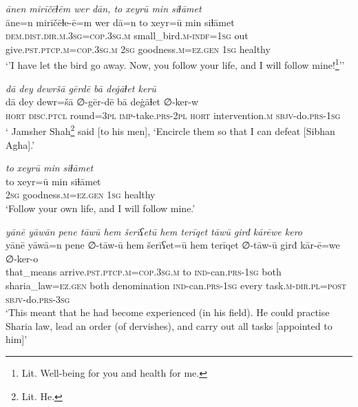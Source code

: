 \ea \label{DP.50}
\textit{ānen mirīčēɫēm wer dān, to xeyrū min siɫāmet} \\ 
\gll āne=n mirīčēɫe-ē=m wer dā=n to xeyr=ū min siɫāmet \\ 
 \textsc{dem.dist}\textsc{.dir}\textsc{.m}\textsc{.3sg}\textsc{=cop}\textsc{.3sg}\textsc{.m} small\_bird\textsc{.m}\textsc{-indf}\textsc{=1sg} out give\textsc{.pst}\textsc{.ptcp}\textsc{.m}\textsc{=cop}\textsc{.3sg}\textsc{.m} \textsc{2sg} goodness\textsc{.m}\textsc{=ez}\textsc{.gen} \textsc{1sg} healthy \\ 
\glt `’I have let the bird go away. Now, you follow your life, and I will follow mine!\footnote{Lit. Well-being for you and health for me.}’'
\z 
 
\ea \label{DP.51}
\textit{dā dey dewršā gērdē bā deġāɫet kerū} \\ 
\gll dā dey dewr=šā ∅-gēr-dē bā deġāɫet ∅-ker-w \\ 
 \textsc{hort} \textsc{disc.ptcl} round\textsc{=3pl} \textsc{imp-}take\textsc{.prs}\textsc{-2pl} \textsc{hort} intervention\textsc{.m} \textsc{sbjv-}do\textsc{.prs}\textsc{-1sg} \\ 
\glt ` Jamsher Shah\footnote{Lit. He.} said [to his men], ‘Encircle them so that I can defeat [Sibhan Agha].'
\z 
 
\ea \label{DP.55}
\textit{to xeyrū min siɫāmet} \\ 
\gll to xeyr=ū min siɫāmet \\ 
 \textsc{2sg} goodness\textsc{.m}\textsc{=ez}\textsc{.gen} \textsc{1sg} healthy \\ 
\glt `Follow your own life, and I will follow mine.'
\z 
 
\ea \label{ZP.19}
\textit{yānē yāwān pene tāwū hem šerīʕetū hem terīqet tāwū girđ kārēwe kero} \\ 
\gll yānē yāwā=n pene ∅-tāw-ū hem šerīʕet=ū hem terīqet ∅-tāw-ū girđ kār-ē=we ∅-ker-o \\ 
 that\_means arrive\textsc{.pst}\textsc{.ptcp}\textsc{.m}\textsc{=cop}\textsc{.3sg}\textsc{.m} to \textsc{ind-}can\textsc{.prs}\textsc{-\textsc{1sg}} both sharia\_law\textsc{\textsc{=ez.gen}} both denomination \textsc{ind-}can\textsc{.prs}\textsc{-\textsc{1sg}} every task\textsc{.m}\textsc{-dir}\textsc{.pl}\textsc{=\textsc{post}} \textsc{sbjv-}do\textsc{.prs}\textsc{-3sg} \\ 
\glt `This meant that he had become experienced (in his field). He could practise Sharia law, lead an order (of dervishes), and carry out all tasks [appointed to him]'
\z 
 
